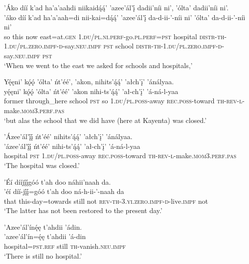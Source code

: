 \ea\label{ex:text7-17-1}
’Áko díí k’ad ha’a’aahdi niikaidą́ą́’ ’azee’ál’į́ dadii’níi ni’, ’ólta’ dadii’níi ni’.\\
\gll ’áko	díí	k’ad	ha’a’aah=di	nii-kai=dą́ą́’	’azee’ál’į́	da-d-ii-’-níi	ni’	’ólta’	da-d-ii-’-níi	ni’\\
     so	this	now	east=at.\textsc{gen}	1.\textsc{du}/\textsc{pl}.\textsc{ni}.\textsc{perf}-go.\textsc{pl}.\textsc{perf}=\textsc{pst}	hospital	\textsc{distr}-\textsc{th}-1.\textsc{du}/\textsc{pl}.\textsc{zero}.\textsc{impf}-\textsc{d}-say.\textsc{neu}.\textsc{impf}	\textsc{pst}	school	\textsc{distr}-\textsc{th}-1.\textsc{du}/\textsc{pl}.\textsc{zero}.\textsc{impf}-\textsc{d}-say.\textsc{neu}.\textsc{impf}	\textsc{pst}\\
\glt `When we went to the east we asked for schools and hospitals,'
\z

\ea\label{ex:text7-17-2}
Yę́ęni’ kǫ́ǫ́ ’ólta’ ńt’éé’, ’akon, nihits’ą́ą́’ ’ałch’į’ ’ánályaa.\\
\gll yę́ęni’	kǫ́ǫ́	’ólta’	ńt’éé’	’akon	nihi-ts’ą́ą́’	’ał-ch’į’	’á-ná-l-yaa\\
     former	through\_here	school	\textsc{pst}	so	1.\textsc{du}/\textsc{pl}.\textsc{poss}-away	\textsc{rec}.\textsc{poss}-toward	\textsc{th}-\textsc{rev}-\textsc{l}-make.\textsc{mom}3.\textsc{perf}.\textsc{pas}\\
\glt `but alas the school that we did have (here at Kayenta) was closed.'
\z

\ea\label{ex:text7-17-3}
’Ázee’ál’į́į́ ńt’éé’ nihits’ą́ą́’ ’ałch’į’ ’ánályaa.\\
\gll ’ázee’ál’į́į́	ńt’éé’	nihi-ts’ą́ą́’	’ał-ch’į’	’á-ná-l-yaa\\
     hospital	\textsc{pst}	1.\textsc{du}/\textsc{pl}.\textsc{poss}-away	\textsc{rec}.\textsc{poss}-toward	\textsc{th}-\textsc{rev}-\textsc{l}-make.\textsc{mom}3.\textsc{perf}.\textsc{pas}\\
\glt `The hospital was closed.'
\z

\ea\label{ex:text7-17-4}
’Éí dííjį́į́góó t’ah doo náhii’naah da.\\
\gll ’éí	díí-jį́į́=góó	t’ah	doo	ná-h-ii-’-naah	da\\
     that	this-day=towards	still	not	\textsc{rev}-\textsc{th}-3.\textsc{yi}.\textsc{zero}.\textsc{impf}-\textsc{d}-live.\textsc{impf}	not\\
\glt `The latter has not been restored to the present day.'
\z

\ea\label{ex:text7-17-5}
’Azee’ál’ínę́ę t’ahdii ’ádin.\\
\gll ’azee’ál’ín=ę́ę	t’ahdii	’á-din\\
     hospital=\textsc{pst}.\textsc{ref}	still	\textsc{th}-vanish.\textsc{neu}.\textsc{impf}\\
\glt `There is still no hospital.'
\z

